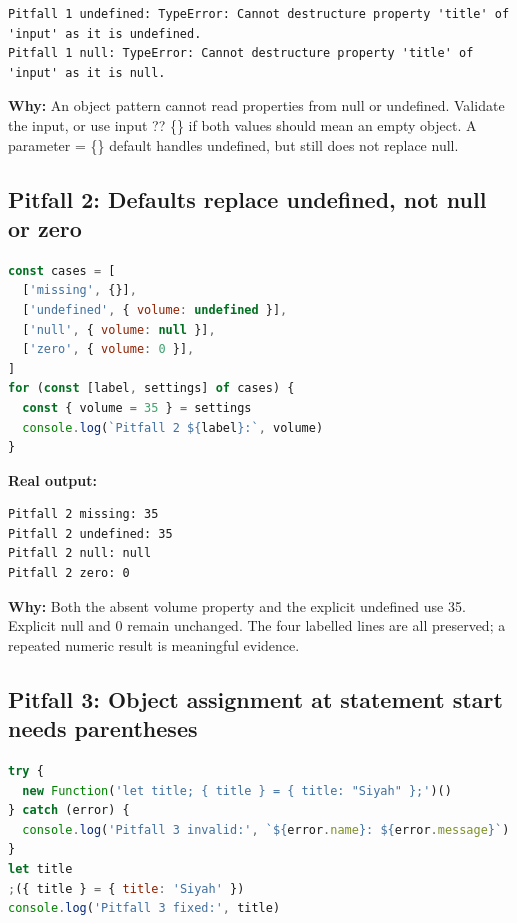 \documentclass[
  10pt,
  a4paper,
  titlepage]{article}
\begin{document}
\Needspace{41.2pt}
\begin{lstlisting}
Pitfall 1 undefined: TypeError: Cannot destructure property 'title' of 'input' as it is undefined.
Pitfall 1 null: TypeError: Cannot destructure property 'title' of 'input' as it is null.
\end{lstlisting}

\textbf{Why:} An object pattern cannot read properties from null or
undefined. Validate the input, or use input ?? \{\} if both values
should mean an empty object. A parameter = \{\} default handles
undefined, but still does not replace null.

\subsection{Pitfall 2: Defaults replace undefined, not null or
zero}\label{pitfall-2-defaults-replace-undefined-not-null-or-zero}

\Needspace{82.4pt}
\begin{lstlisting}[language=JavaScript]
const cases = [
  ['missing', {}],
  ['undefined', { volume: undefined }],
  ['null', { volume: null }],
  ['zero', { volume: 0 }],
]
for (const [label, settings] of cases) {
  const { volume = 35 } = settings
  console.log(`Pitfall 2 ${label}:`, volume)
}
\end{lstlisting}


\textbf{Real output:}

\Needspace{61.8pt}
\begin{lstlisting}
Pitfall 2 missing: 35
Pitfall 2 undefined: 35
Pitfall 2 null: null
Pitfall 2 zero: 0
\end{lstlisting}

\textbf{Why:} Both the absent volume property and the explicit undefined
use 35. Explicit null and 0 remain unchanged. The four labelled lines
are all preserved; a repeated numeric result is meaningful evidence.

\subsection{Pitfall 3: Object assignment at statement start needs
parentheses}\label{pitfall-3-object-assignment-at-statement-start-needs-parentheses}

\Needspace{82.4pt}
\begin{lstlisting}[language=JavaScript]
try {
  new Function('let title; { title } = { title: "Siyah" };')()
} catch (error) {
  console.log('Pitfall 3 invalid:', `${error.name}: ${error.message}`)
}
let title
;({ title } = { title: 'Siyah' })
console.log('Pitfall 3 fixed:', title)
\end{lstlisting}
\end{document}
